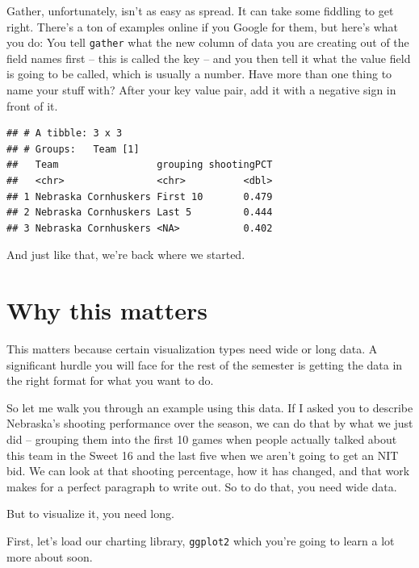 \documentclass[]{book}
\newenvironment{Shaded}{\begin{snugshade}}{\end{snugshade}}
\newcommand{\KeywordTok}[1]{\textcolor[rgb]{0.13,0.29,0.53}{\textbf{#1}}}
\newcommand{\StringTok}[1]{\textcolor[rgb]{0.31,0.60,0.02}{#1}}
\newcommand{\OperatorTok}[1]{\textcolor[rgb]{0.81,0.36,0.00}{\textbf{#1}}}
\newcommand{\NormalTok}[1]{#1}
\begin{document}
Gather, unfortunately, isn't as easy as spread. It can take some
fiddling to get right. There's a ton of examples online if you Google
for them, but here's what you do: You tell \texttt{gather} what the new
column of data you are creating out of the field names first -- this is
called the key -- and you then tell it what the value field is going to
be called, which is usually a number. Have more than one thing to name
your stuff with? After your key value pair, add it with a negative sign
in front of it.

\begin{Shaded}
\end{Shaded}

\begin{verbatim}
## # A tibble: 3 x 3
## # Groups:   Team [1]
##   Team                 grouping shootingPCT
##   <chr>                <chr>          <dbl>
## 1 Nebraska Cornhuskers First 10       0.479
## 2 Nebraska Cornhuskers Last 5         0.444
## 3 Nebraska Cornhuskers <NA>           0.402
\end{verbatim}

And just like that, we're back where we started.

\section{Why this matters}\label{why-this-matters}

This matters because certain visualization types need wide or long data.
A significant hurdle you will face for the rest of the semester is
getting the data in the right format for what you want to do.

So let me walk you through an example using this data. If I asked you to
describe Nebraska's shooting performance over the season, we can do that
by what we just did -- grouping them into the first 10 games when people
actually talked about this team in the Sweet 16 and the last five when
we aren't going to get an NIT bid. We can look at that shooting
percentage, how it has changed, and that work makes for a perfect
paragraph to write out. So to do that, you need wide data.

But to visualize it, you need long.

First, let's load our charting library, \texttt{ggplot2} which you're
going to learn a lot more about soon.
\end{document}
